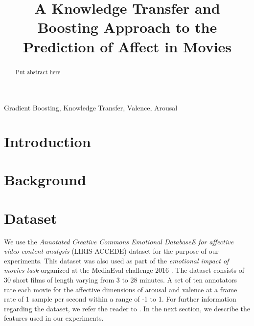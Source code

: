 \documentclass{article}
\title{A Knowledge Transfer and Boosting Approach to the Prediction of Affect in Movies}
\begin{document}
\ninept
%
\maketitle
%
\begin{abstract}
   Put abstract here 
 
\end{abstract}
%
\begin{keywords}
Gradient Boosting, Knowledge Transfer, Valence, Arousal
\end{keywords}
%
\section{Introduction}
\label{sec:intro}

\section{Background}


\section{Dataset}

We use the {\it Annotated Creative Commons Emotional DatabaseE for affective video content analysis} (LIRIS-ACCEDE) dataset for the purpose of our experiments.
This dataset was also used as part of the {\it emotional impact of movies task} organized at the MediaEval challenge 2016 \cite{}.
The dataset consists of 30 short films of length varying from 3 to 28 minutes.
A set of ten annotators rate each movie for the affective dimensions of arousal and valence at a frame rate of 1 sample per second within a range of -1 to 1. 
For further information regarding the dataset, we refer the reader to \cite{}.
In the next section, we describe the features used in our experiments.
\end{document}
